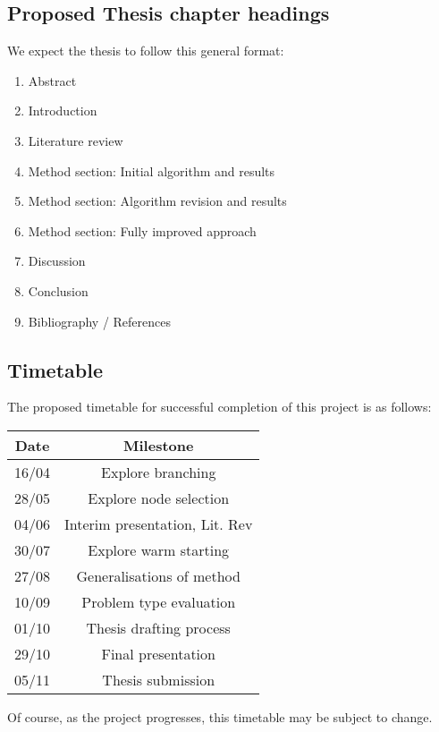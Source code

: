 \documentclass[12pt, a4paper]{article}
\begin{document}
\subsection{Proposed Thesis chapter headings}
We expect the thesis to follow this general format:
\begin{enumerate}
  \item Abstract
  \item Introduction
  \item Literature review
  \item Method section: Initial algorithm and results
  \item Method section: Algorithm revision and results 
  \item Method section: Fully improved approach
  \item Discussion
  \item Conclusion
  \item Bibliography / References
\end{enumerate}
\subsection{Timetable}
The proposed timetable for successful completion of this project is as follows:

\begin{center}
  \begin{tabular}{||c | c||}
  \hline
  Date & Milestone \\ [0.5ex]
  \hline\hline
  16/04 & Explore branching \\
  \hline
  28/05 & Explore node selection \\
  \hline
  04/06 & Interim presentation, Lit. Rev  \\
  \hline
  30/07 & Explore warm starting \\
  \hline
  27/08 & Generalisations of method \\
  \hline
  10/09 & Problem type evaluation \\
  \hline
  01/10 & Thesis drafting process \\
  \hline
  29/10 & Final presentation \\
  \hline 
  05/11 & Thesis submission \\ [1ex]
  \hline
  \end{tabular}
\end{center}

Of course, as the project progresses, this timetable may be subject to change.
\end{document}
